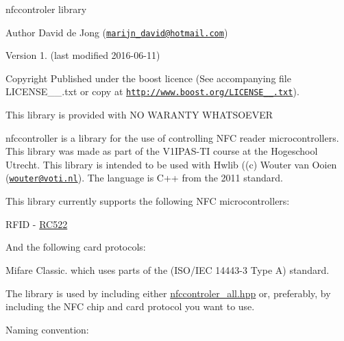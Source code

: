 nfccontroler library

\begin{DoxyAuthor}{Author}
David de Jong (\href{mailto:marijn_david@hotmail.com}{\tt marijn\+\_\+david@hotmail.\+com}) 
\end{DoxyAuthor}
\begin{DoxyVersion}{Version}
1. (last modified 2016-\/06-\/11) 
\end{DoxyVersion}
\begin{DoxyCopyright}{Copyright}
Published under the boost licence (See accompanying file L\+I\+C\+E\+N\+S\+E\+\_\+\_.\+txt or copy at \href{http://www.boost.org/LICENSE_1_0.txt}{\tt http\+://www.\+boost.\+org/\+L\+I\+C\+E\+N\+S\+E\+\_\+\_.\+txt}).
\end{DoxyCopyright}
This library is provided with NO W\+A\+R\+A\+N\+TY W\+H\+A\+T\+S\+O\+E\+V\+ER

nfccontroller is a library for the use of controlling N\+FC reader microcontrollers. This library was made as part of the V1\+I\+P\+A\+S-\/\+TI course at the Hogeschool Utrecht. This library is intended to be used with Hwlib ((c) Wouter van Ooien (\href{mailto:wouter@voti.nl}{\tt wouter@voti.\+nl}). The language is C++ from the 2011 standard.

This library currently supports the following N\+FC microcontrollers\+:
\begin{DoxyItemize}
\item R\+F\+ID -\/ \hyperlink{class_r_c522}{R\+C522}
\end{DoxyItemize}

And the following card protocols\+:
\begin{DoxyItemize}
\item Mifare Classic. which uses parts of the (I\+S\+O/\+I\+EC 14443-\/3 Type A) standard.
\end{DoxyItemize}

The library is used by including either \hyperlink{nfccontroler__all_8hpp_source}{nfccontroler\+\_\+all.\+hpp} or, preferably, by including the N\+FC chip and card protocol you want to use.

Naming convention\+:


